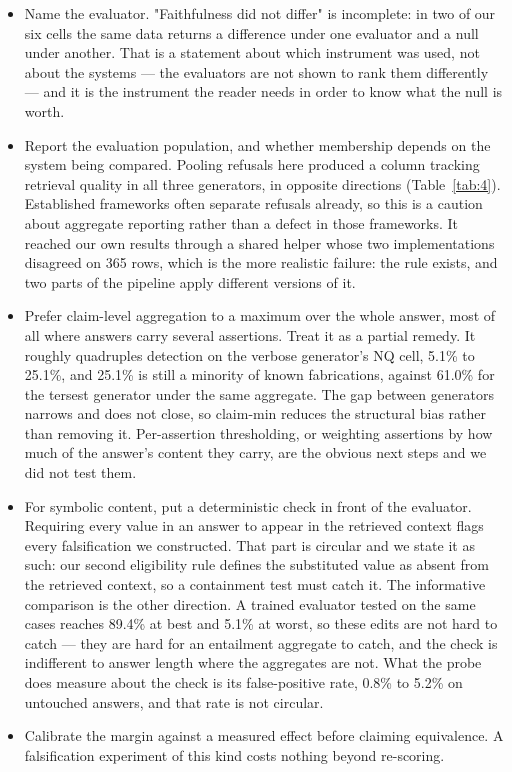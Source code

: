 \documentclass[11pt]{article}
\begin{document}
\begin{itemize}
\item Name the evaluator. "Faithfulness did not differ" is incomplete: in two of our six cells the same data returns a difference under one evaluator and a null under another. That is a statement about which instrument was used, not about the systems --- the evaluators are not shown to rank them differently --- and it is the instrument the reader needs in order to know what the null is worth.
\item Report the evaluation population, and whether membership depends on the system being compared. Pooling refusals here produced a column tracking retrieval quality in all three generators, in opposite directions (Table~\ref{tab:4}). Established frameworks often separate refusals already, so this is a caution about aggregate reporting rather than a defect in those frameworks. It reached our own results through a shared helper whose two implementations disagreed on 365 rows, which is the more realistic failure: the rule exists, and two parts of the pipeline apply different versions of it.
\item Prefer claim-level aggregation to a maximum over the whole answer, most of all where answers carry several assertions. Treat it as a partial remedy. It roughly quadruples detection on the verbose generator's NQ cell, 5.1\% to 25.1\%, and 25.1\% is still a minority of known fabrications, against 61.0\% for the tersest generator under the same aggregate. The gap between generators narrows and does not close, so claim-min reduces the structural bias rather than removing it. Per-assertion thresholding, or weighting assertions by how much of the answer's content they carry, are the obvious next steps and we did not test them.
\item For symbolic content, put a deterministic check in front of the evaluator. Requiring every value in an answer to appear in the retrieved context flags every falsification we constructed. That part is circular and we state it as such: our second eligibility rule defines the substituted value as absent from the retrieved context, so a containment test must catch it. The informative comparison is the other direction. A trained evaluator tested on the same cases reaches 89.4\% at best and 5.1\% at worst, so these edits are not hard to catch --- they are hard for an entailment aggregate to catch, and the check is indifferent to answer length where the aggregates are not. What the probe does measure about the check is its false-positive rate, 0.8\% to 5.2\% on untouched answers, and that rate is not circular.
\item Calibrate the margin against a measured effect before claiming equivalence. A falsification experiment of this kind costs nothing beyond re-scoring.
\end{itemize}
\end{document}
